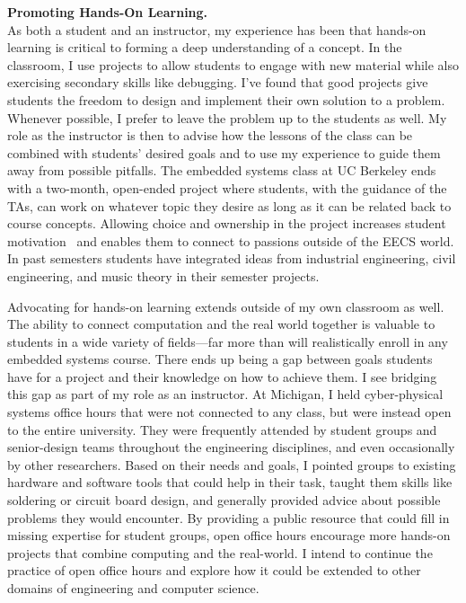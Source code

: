 \documentclass[11pt]{article} %
\begin{document}
\bigskip
\textbf{\textsf{\large Promoting Hands-On Learning.}}\\
As both a student and an instructor, my experience has been that hands-on
learning is critical to forming a deep understanding of a concept. In the
classroom, I use projects to allow students to engage with new material while
also exercising secondary skills like debugging. I've found that good projects
give students the freedom to design and implement their own solution to a
problem. Whenever possible, I prefer to leave the problem up to the students as
well. My role as the instructor is then to advise how the lessons of the class
can be combined with students' desired goals and to use my experience to guide
them away from possible pitfalls. The embedded systems class at UC Berkeley
ends with a two-month, open-ended project where students, with the guidance of
the TAs, can work on whatever topic they desire as long as it can be related
back to course concepts. Allowing choice and ownership in the project increases
student motivation~\footnotemark{} and enables them to connect to passions outside
of the EECS world. In past semesters students have integrated ideas
from industrial engineering, civil engineering, and music theory in their
semester projects.


Advocating for hands-on learning extends outside of my own classroom as well.
The ability to connect computation and the real world together is valuable to
students in a wide variety of fields---far more than will realistically enroll
in any embedded systems course.
%
There ends up being a gap between goals students have for a project and their
knowledge on how to achieve them.
I see bridging this gap as part of my role as an instructor.
%
At Michigan, I held cyber-physical systems office hours that were not connected
to any class, but were instead open to the entire university. They were
frequently attended by student groups and senior-design teams throughout the
engineering disciplines, and even occasionally by other researchers.
%
Based on their needs and goals,
I pointed groups to existing hardware and software tools that could help in
their task, taught them skills like soldering or circuit board design, and
generally provided advice about possible problems they would encounter.
%
By providing a public resource that could fill in missing expertise for student
groups, open office hours encourage more hands-on projects that combine
computing and the real-world. I intend to continue the practice of open office
hours and explore how it could be extended to other domains of engineering and
computer science.
\end{document}
